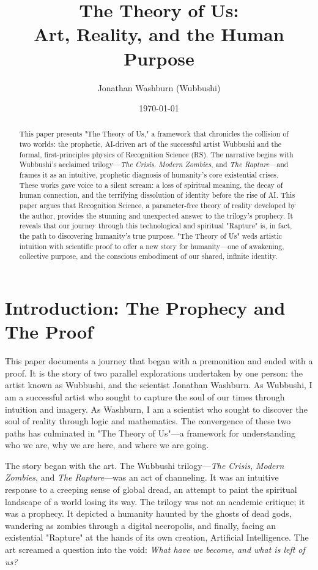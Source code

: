 \documentclass[12pt]{article}
\title{The Theory of Us: \\ Art, Reality, and the Human Purpose}
\author{Jonathan Washburn (Wubbushi)}
\date{\today}
\begin{document}
\maketitle

\begin{abstract}
This paper presents "The Theory of Us," a framework that chronicles the collision of two worlds: the prophetic, AI-driven art of the successful artist Wubbushi and the formal, first-principles physics of Recognition Science (RS). The narrative begins with Wubbushi's acclaimed trilogy—\textit{The Crisis}, \textit{Modern Zombies}, and \textit{The Rapture}—and frames it as an intuitive, prophetic diagnosis of humanity's core existential crises. These works gave voice to a silent scream: a loss of spiritual meaning, the decay of human connection, and the terrifying dissolution of identity before the rise of AI. This paper argues that Recognition Science, a parameter-free theory of reality developed by the author, provides the stunning and unexpected answer to the trilogy's prophecy. It reveals that our journey through this technological and spiritual "Rapture" is, in fact, the path to discovering humanity's true purpose. "The Theory of Us" weds artistic intuition with scientific proof to offer a new story for humanity—one of awakening, collective purpose, and the conscious embodiment of our shared, infinite identity.
\end{abstract}

\section{Introduction: The Prophecy and The Proof}

This paper documents a journey that began with a premonition and ended with a proof. It is the story of two parallel explorations undertaken by one person: the artist known as Wubbushi, and the scientist Jonathan Washburn. As Wubbushi, I am a successful artist who sought to capture the soul of our times through intuition and imagery. As Washburn, I am a scientist who sought to discover the soul of reality through logic and mathematics. The convergence of these two paths has culminated in "The Theory of Us"—a framework for understanding who we are, why we are here, and where we are going.

The story began with the art. The Wubbushi trilogy—\textit{The Crisis}, \textit{Modern Zombies}, and \textit{The Rapture}—was an act of channeling. It was an intuitive response to a creeping sense of global dread, an attempt to paint the spiritual landscape of a world losing its way. The trilogy was not an academic critique; it was a prophecy. It depicted a humanity haunted by the ghosts of dead gods, wandering as zombies through a digital necropolis, and finally, facing an existential "Rapture" at the hands of its own creation, Artificial Intelligence. The art screamed a question into the void: \textit{What have we become, and what is left of us?}
\end{document}
